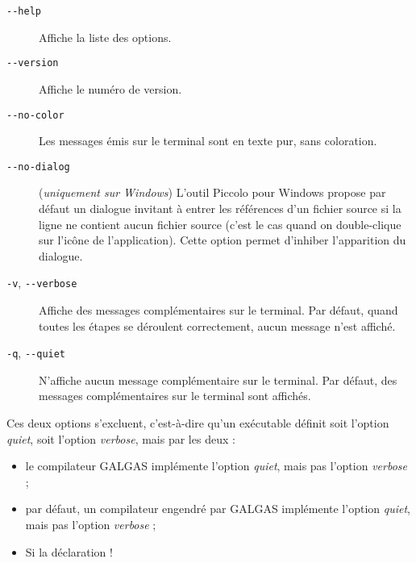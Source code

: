 \begin{description}
  \item[\texttt{-{-}help}] Affiche la liste des options.

  \item[\texttt{-{-}version}] Affiche le numéro de version.

  \item[\texttt{-{-}no-color}] Les messages émis sur le terminal sont en texte pur, sans coloration.

  \item[\texttt{-{-}no-dialog}] (\emph{uniquement sur Windows}) L’outil Piccolo pour Windows propose par défaut un dialogue invitant à entrer les références d’un fichier source si la ligne ne contient aucun fichier source (c’est le cas quand on double-clique sur l’icône de l’application). Cette option permet d'inhiber l’apparition du dialogue.
\end{description}




\begin{description}
  \item[\texttt{-v}, \texttt{-{-}verbose}] Affiche des messages complémentaires sur le terminal. Par défaut, quand toutes les étapes se déroulent correctement, aucun message n’est affiché.
  \item[\texttt{-q}, \texttt{-{-}quiet}] N'affiche aucun message complémentaire sur le terminal. Par défaut, des messages complémentaires sur le terminal sont affichés.
\end{description}

Ces deux options s'excluent, c'est-à-dire qu'un exécutable définit soit l'option \emph{quiet}, soit l'option \emph{verbose}, mais par les deux :
\begin{itemize}
  \item le compilateur GALGAS implémente l'option \emph{quiet}, mais pas l'option \emph{verbose} ;
  \item par défaut, un compilateur engendré par GALGAS implémente l'option \emph{quiet}, mais pas l'option \emph{verbose} ;
  \item Si la déclaration \ggs!%
\end{itemize}





